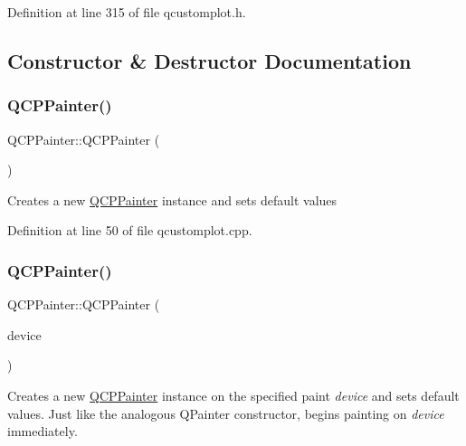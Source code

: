 Definition at line 315 of file qcustomplot.\+h.



\subsection{Constructor \& Destructor Documentation}
\mbox{\label{class_q_c_p_painter_a3c52cb0f43f34573d29bea487da28fe8}} 
\subsubsection{\texorpdfstring{Q\+C\+P\+Painter()}{QCPPainter()}\hspace{0.1cm}{\footnotesize\ttfamily [1/2]}}
{\footnotesize\ttfamily Q\+C\+P\+Painter\+::\+Q\+C\+P\+Painter (\begin{DoxyParamCaption}{ }\end{DoxyParamCaption})}

Creates a new \hyperlink{class_q_c_p_painter}{Q\+C\+P\+Painter} instance and sets default values 

Definition at line 50 of file qcustomplot.\+cpp.

\mbox{\label{class_q_c_p_painter_ae58dbb1795ddc4351ab324dc9898aa22}} 
\subsubsection{\texorpdfstring{Q\+C\+P\+Painter()}{QCPPainter()}\hspace{0.1cm}{\footnotesize\ttfamily [2/2]}}
{\footnotesize\ttfamily Q\+C\+P\+Painter\+::\+Q\+C\+P\+Painter (\begin{DoxyParamCaption}\item[{Q\+Paint\+Device $\ast$}]{device }\end{DoxyParamCaption})}

Creates a new \hyperlink{class_q_c_p_painter}{Q\+C\+P\+Painter} instance on the specified paint {\itshape device} and sets default values. Just like the analogous Q\+Painter constructor, begins painting on {\itshape device} immediately.

